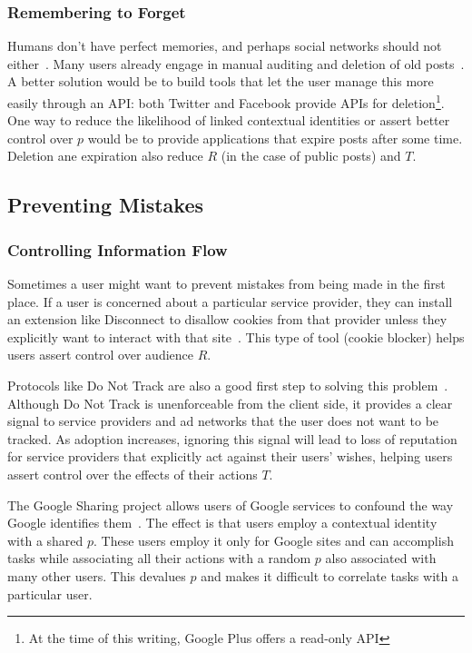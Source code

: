 \documentclass{llncs}
\begin{document}
\subsubsection{Remembering to Forget}
Humans don't have perfect memories, and perhaps social
networks should not either~\cite{delete}. Many users already engage in manual auditing and
deletion of old posts~\cite{fbtips2}. A better solution would be to build tools
that let the user manage this more easily through an API: both Twitter and Facebook provide
APIs for deletion\footnote{At the time of this writing, Google Plus offers a
read-only API}. One way to reduce the likelihood of linked contextual
identities or assert better control over $p$ would be to provide applications that expire posts after some time.
Deletion ane expiration also reduce $R$ (in the case of public posts) and $T$.

\begin{comment}
\cite{viegas}blogger's expectation of privacy
\end{comment}

\subsection{Preventing Mistakes}
\subsubsection{Controlling Information Flow}
Sometimes a user might want to prevent mistakes from being made in the first
place. If a user is concerned about a particular service provider, they can
install an extension like Disconnect to disallow cookies from that provider
unless they explicitly want to interact with that site~\cite{disconnect}.
This type of tool (cookie blocker) helps users assert control over audience $R$.

Protocols like Do Not Track are also a good first step to solving this
problem~\cite{dnt}. Although Do Not Track is unenforceable from the client
side, it provides a clear signal to service providers and ad networks
that the user does not want to be tracked. As adoption increases, ignoring this
signal will lead to loss of reputation for service providers that explicitly
act against their users' wishes, helping
users assert control over the effects of their actions $T$.

The Google Sharing project allows users of Google services to confound the way
Google identifies them~\cite{googlesharing}.  The effect is that users employ a
contextual identity with a shared $p$.  These users
employ it only for Google sites and can accomplish tasks
while associating all their actions with a random $p$ also associated
with many other users.  This devalues $p$ and makes it difficult to correlate
tasks with a particular user.
\end{document}
